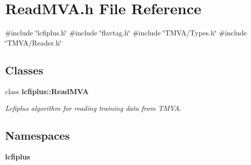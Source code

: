 \section{Read\+M\+V\+A.\+h File Reference}
\label{ReadMVA_8h}
{\ttfamily \#include \char`\"{}lcfiplus.\+h\char`\"{}}\newline
{\ttfamily \#include \char`\"{}flavtag.\+h\char`\"{}}\newline
{\ttfamily \#include \char`\"{}T\+M\+V\+A/\+Types.\+h\char`\"{}}\newline
{\ttfamily \#include \char`\"{}T\+M\+V\+A/\+Reader.\+h\char`\"{}}\newline
\subsection*{Classes}
\begin{DoxyCompactItemize}
\item 
class \textbf{ lcfiplus\+::\+Read\+M\+VA}
\begin{DoxyCompactList}\small\item\em Lcfiplus algorithm for reading training data from T\+M\+VA. \end{DoxyCompactList}\end{DoxyCompactItemize}
\subsection*{Namespaces}
\begin{DoxyCompactItemize}
\item 
 \textbf{ lcfiplus}
\end{DoxyCompactItemize}
